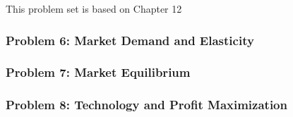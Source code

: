 \documentclass{article}
\begin{document}
This problem set is based on Chapter 12 \cite{Valrian_Inter_Micro}

\subsubsection*{Problem 6: Market Demand and Elasticity}
 \newpage
\subsubsection*{Problem 7: Market Equilibrium}

\newpage
\subsubsection*{Problem 8: Technology and Profit Maximization }

\newpage
\printbibliography
\end{document}
